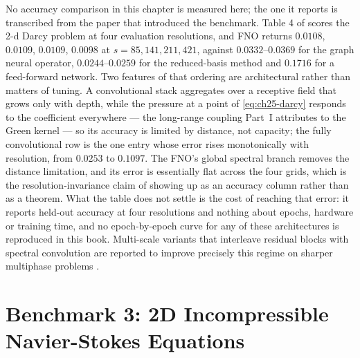 No accuracy comparison in this chapter is measured
here; the one it reports is transcribed from the paper that introduced the
benchmark. Table 4 of \cite{li2021fourier} scores the 2-d Darcy problem at four
evaluation resolutions, and FNO returns $0.0108$, $0.0109$, $0.0109$, $0.0098$ at
$s = 85, 141, 211, 421$, against $0.0332$--$0.0369$ for the graph neural operator,
$0.0244$--$0.0259$ for the reduced-basis method and $0.1716$ for a feed-forward
network. Two features of that ordering are architectural rather than matters of
tuning. A convolutional stack aggregates over a receptive field that grows only
with depth, while the pressure at a point of \eqref{eq:ch25-darcy} responds to the
coefficient everywhere --- the long-range coupling Part~I attributes to the Green
kernel --- so its accuracy is limited by distance, not capacity; the fully
convolutional row is the one entry whose error rises monotonically with
resolution, from $0.0253$ to $0.1097$. The FNO's global spectral branch removes the
distance limitation, and its error is essentially flat across the four grids, which
is the resolution-invariance claim of 
showing up as an accuracy column rather than as a theorem. What the table does not
settle is the cost of reaching that error: it reports held-out accuracy at four
resolutions and nothing about epochs, hardware or training time, and no
epoch-by-epoch curve for any of these architectures is reproduced in this book.
Multi-scale variants that interleave residual blocks with spectral convolution are
reported to improve precisely this regime on sharper multiphase problems
\cite{wen2022ufno}.

\section{Benchmark 3: 2D Incompressible Navier-Stokes Equations}
\label{sec:ch25-navierstokes}

